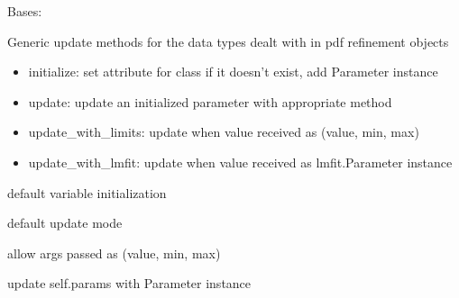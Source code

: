 \documentclass[letterpaper,10pt,english]{sphinxmanual}
\begin{document}
\begin{fulllineitems}
\label{\detokenize{rst/utilities:mstack.utilities.UpdateMethods}}
Bases: 

Generic update methods for the data types dealt with in pdf refinement objects
\begin{itemize}
\item {} 
initialize: set attribute for class if it doesn't exist, add Parameter instance

\item {} 
update: update an initialized parameter with appropriate method

\item {} 
update\_with\_limits: update when value received as (value, min, max)

\item {} 
update\_with\_lmfit: update when value received as lmfit.Parameter instance

\end{itemize}

\begin{fulllineitems}
\label{\detokenize{rst/utilities:mstack.utilities.UpdateMethods.initialize}}
default variable initialization

\end{fulllineitems}


\begin{fulllineitems}
\label{\detokenize{rst/utilities:mstack.utilities.UpdateMethods.update}}
default update mode

\end{fulllineitems}


\begin{fulllineitems}
\label{\detokenize{rst/utilities:mstack.utilities.UpdateMethods.update_with_limits}}
allow args passed as (value, min, max)

\end{fulllineitems}


\begin{fulllineitems}
\label{\detokenize{rst/utilities:mstack.utilities.UpdateMethods.update_with_lmfit}}
update self.params with Parameter instance

\end{fulllineitems}


\end{fulllineitems}
\end{document}
